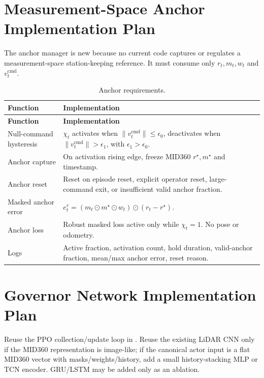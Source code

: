 \documentclass[11pt]{article}
\newcommand{\code}[1]{\texttt{\detokenize{#1}}}
\newcommand{\vcmd}{v^{\mathrm{cmd}}_t}
\begin{document}
\section{Measurement-Space Anchor Implementation Plan}

The anchor manager is new because no current code captures or regulates a
measurement-space station-keeping reference. It must consume only \(r_t,m_t,w_t\)
and \(\vcmd\).

\begin{longtable}{@{}L{0.28\textwidth}L{0.58\textwidth}@{}}
\caption{Anchor requirements.}\\
\toprule
\textbf{Function} & \textbf{Implementation} \\
\midrule
\endfirsthead
\toprule
\textbf{Function} & \textbf{Implementation} \\
\midrule
\endhead
Null-command hysteresis & \(\chi_t\) activates when \(\|\vcmd\|\le\epsilon_0\), deactivates when \(\|\vcmd\|>\epsilon_1\), with \(\epsilon_1>\epsilon_0\). \\
Anchor capture & On activation rising edge, freeze MID360 \(r^\star,m^\star\) and timestamp. \\
Anchor reset & Reset on episode reset, explicit operator reset, large-command exit, or insufficient valid anchor fraction. \\
Masked anchor error & \(e^r_t=(m_t\odot m^\star\odot w_t)\odot(r_t-r^\star)\). \\
Anchor loss & Robust masked loss active only while \(\chi_t=1\). No pose or odometry. \\
Logs & Active fraction, activation count, hold duration, valid-anchor fraction, mean/max anchor error, reset reason. \\
\bottomrule
\end{longtable}

\section{Governor Network Implementation Plan}

Reuse the PPO collection/update loop in \code{training/scripts/ppo.py}. Reuse
the existing LiDAR CNN only if the MID360 representation is image-like; if the
canonical actor input is a flat MID360 vector with masks/weights/history, add a
small history-stacking MLP or TCN encoder. GRU/LSTM may be added only as an
ablation.
\end{document}
